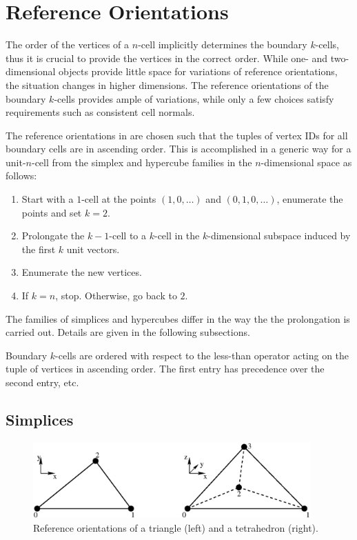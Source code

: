 \chapter{Reference Orientations} \label{chap:orientations}

The order of the vertices of a $n$-cell implicitly determines the boundary $k$-cells,
thus it is crucial to provide the vertices in the correct order.
While one- and two-dimensional objects provide little space for variations of reference orientations,
the situation changes in higher dimensions. The reference orientations
of the boundary $k$-cells provides ample of variations, while only a few choices
satisfy requirements such as consistent cell normals.

The reference orientations in {\ViennaGrid} are chosen such that the tuples
of vertex IDs for all boundary cells are in ascending order. This is accomplished
in a generic way for a unit-$n$-cell from the simplex and hypercube families in the $n$-dimensional space as follows:
\begin{enumerate}
 \item Start with a $1$-cell at the points $(1, 0, \ldots)$ and $(0, 1, 0, \ldots)$, enumerate the points and set $k=2$.
 \item Prolongate the $k-1$-cell to a $k$-cell in the $k$-dimensional subspace induced by the first $k$ unit vectors.
 \item Enumerate the new vertices.
 \item If $k=n$, stop. Otherwise, go back to $2$.
\end{enumerate}

The families of simplices and hypercubes differ in the way the the prolongation is carried out.
Details are given in the following subsections.

Boundary $k$-cells are ordered with respect to the less-than operator acting on the tuple of vertices in ascending order.
The first entry has precedence over the second entry, etc.

\section{Simplices}
\begin{figure}[tb]
\centering
 \includegraphics[width=0.95\textwidth]{figures/orientation-simplex.eps}
 \caption{Reference orientations of a triangle (left) and a tetrahedron (right).}
 \label{fig:orientation-simplex}
\end{figure}

